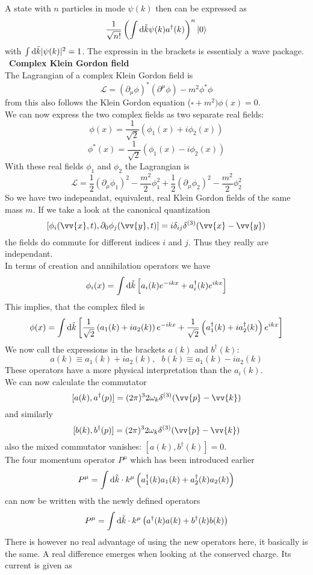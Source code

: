 \documentclass{include/thesisclass}
\newcommand{\LL}{\mathcal{L}}
\newcommand{\cc}{\cdot}
\newcommand{\rk}{\rangle}
\newcommand{\vx}{\vv{x}}
\newcommand{\vy}{\vv{y}}
\newcommand{\vp}{\vv{p}}
\newcommand{\dd}{{\rm d}}
\newcommand{\p}{\partial}
\newcommand{\sub}[1]{~\newline\newline\textbf{#1}\\}
\begin{document}
A state with $n$ particles in mode $\psi(k)$ then can be expressed as
\[ \frac{1}{\sqrt{n!}} \left( \int \dd \tilde{k} \psi(k) a^\dagger(k) \right)^n | 0 \rk\]
with $\int \dd \tilde{k} | \psi(k) |^2 = 1$. The expressin in the brackets is essentialy a wave package.
\sub{Complex Klein Gordon field}
The Lagrangian of a complex Klein Gordon field is
\[ \LL = ( \p_\mu \phi) ^* ( \p ^\mu \phi) - m^2 \phi^* \phi \]
from this also follows the Klein Gordon equation ($\square + m^2) \phi(x) = 0$.\\
We can now express the two complex fields as two separate real fields:
\[ \phi(x) = \frac{1}{\sqrt{2}} \left( \phi_1(x) + i \phi_2(x) \right)\]
\[ \phi^*(x) = \frac{1}{\sqrt{2}} \left( \phi_1(x) - i \phi_2(x) \right)\]
With these real fields $\phi_1$ and $\phi_2$ the Lagrangian is
\[ \LL = \frac{1}{2} ( \p_\mu \phi_1)^2 - \frac{m^2}{2} \phi_1^2 + \frac{1}{2} (\p_\mu\phi_2)^2 - \frac{m^2}{2} \phi_2^2\]
So we have two indepeandat, equivalent, real Klein Gordon fields of the same mass $m$. If we take a look at the canonical quantization
\[ [ \phi_i (\vx, t), \p_0 \phi_j(\vy, t) ] = i \delta_{ij} \delta^{(3)}( \vx - \vy) \]
the fields do commute for different indices $i$ and $j$. Thus they really are independant.\\
In terms of creation and annihilation operators we have
\[ \phi_i(x) = \int \dd \tilde{k} \left[ a_i(k) e^{-ikx} + a_i^\dagger(k) e^{ikx} \right]\]
This implies, that the complex filed is
\[ \phi(x) = \int \dd \tilde{k} \left[ \frac{1}{\sqrt{2}} \left(a_1(k) + i a_2(k)\right) e^{-ikx} + \frac{1}{\sqrt{2}} \left( a_1^\dagger(k) + i a_2^\dagger(k)\right)e^{ikx} \right]\]
We now call the expressions in the brackets $a(k)$ and $b^\dagger(k)$:
\[ a(k) \equiv a_1(k) + i a_2(k), ~~~ b(k) \equiv a_1(k) - i a_2(k)\]
These operators have a more physical interpretation than the $a_i(k)$.\\
We can now calculate the commutator
\[ [a(k), a^\dagger(p)] = (2\pi)^3 2 \omega_k \delta^{(3)}(\vp - \vv{k})\]
and similarly
\[ [b(k), b^\dagger(p)] = (2\pi)^3 2 \omega_k \delta^{(3)}(\vp - \vv{k})\]
also the mixed commutator vanishes: $[a(k), b^\dagger(k)] = 0$.\\
The four momentum operator $P^\mu$ which has been introduced earlier
\[ P^\mu = \int \dd \tilde{k} \cc k^\mu \left( a_1^\dagger(k) a_1(k) + a_2^\dagger(k) a_2(k)\right)\]
can now be written with the newly defined operators
\[ P^\mu = \int \dd \tilde{k} \cc k^\mu \left( a^\dagger(k) a(k) + b^\dagger(k) b(k) \right)\]
There is however no real advantage of using the new operators here, it basically is the same. A real difference emerges when looking at the conserved charge. Its current is given as
\end{document}
